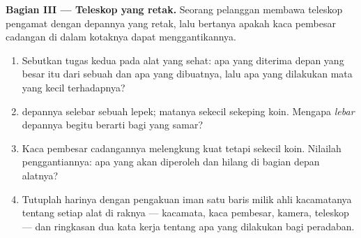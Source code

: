 \begin{problem}
\medskip\noindent\textbf{Bagian III --- Teleskop yang
retak.}
Seorang pelanggan membawa teleskop pengamat  dengan 
depannya yang retak, lalu bertanya apakah kaca pembesar cadangan di
dalam kotaknya dapat menggantikannya.
\begin{enumerate}[resume]
  \item Sebutkan tugas kedua  pada alat yang sehat: apa yang
        diterima  depan yang besar itu dari sebuah  dan
        apa yang dibuatnya, lalu apa yang dilakukan  mata yang
        kecil terhadapnya?
  \item {} depannya selebar sebuah lepek;  matanya sekecil
        sekeping koin. Mengapa \emph{lebar}  depannya begitu
        berarti bagi  yang samar?
  \item Kaca pembesar cadangannya melengkung kuat tetapi sekecil
        koin. Nilailah penggantiannya: apa yang akan diperoleh dan
        hilang di bagian depan alatnya?
  \item Tutuplah harinya dengan pengakuan iman satu baris milik ahli
        kacamatanya tentang setiap alat di raknya --- kacamata, kaca
        pembesar, kamera, teleskop --- dan ringkasan dua kata kerja
        tentang apa yang dilakukan  bagi peradaban.
\end{enumerate}
\end{problem}
